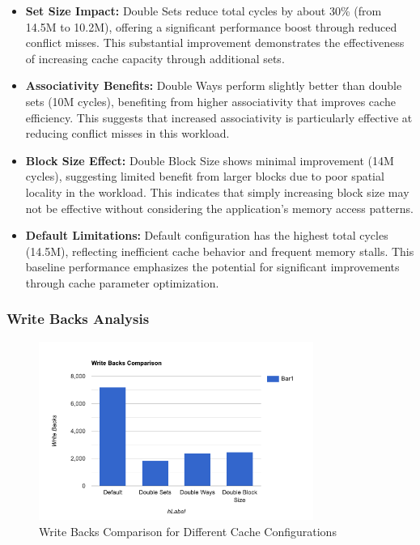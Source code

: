 \documentclass[10pt]{article}
\begin{document}
\begin{itemize}
    \item \textbf{Set Size Impact:} Double Sets reduce total cycles by about 30\% (from 14.5M to 10.2M), offering a significant performance boost through reduced conflict misses. This substantial improvement demonstrates the effectiveness of increasing cache capacity through additional sets.
    
    \item \textbf{Associativity Benefits:} Double Ways perform slightly better than double sets (10M cycles), benefiting from higher associativity that improves cache efficiency. This suggests that increased associativity is particularly effective at reducing conflict misses in this workload.
    
    \item \textbf{Block Size Effect:} Double Block Size shows minimal improvement (14M cycles), suggesting limited benefit from larger blocks due to poor spatial locality in the workload. This indicates that simply increasing block size may not be effective without considering the application's memory access patterns.
    
    \item \textbf{Default Limitations:} Default configuration has the highest total cycles (14.5M), reflecting inefficient cache behavior and frequent memory stalls. This baseline performance emphasizes the potential for significant improvements through cache parameter optimization.
\end{itemize}

\subsubsection{Write Backs Analysis}
\begin{figure}[H]
    \centering
    \includegraphics[width=0.8\textwidth]{./images/write_backs.png}
    \caption{Write Backs Comparison for Different Cache Configurations}
\end{figure}
\end{document}
